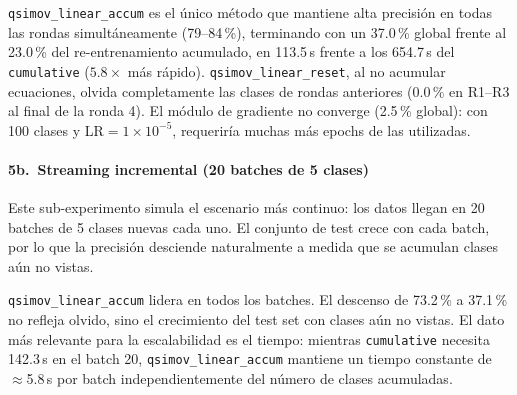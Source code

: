 \texttt{qsimov\_linear\_accum} es el único método que mantiene alta precisión en todas las rondas
simultáneamente (79--84\,\%), terminando con un 37.0\,\% global frente al 23.0\,\% del
re-entrenamiento acumulado, en 113.5\,s frente a los 654.7\,s del \texttt{cumulative}
($5.8\times$ más rápido). \texttt{qsimov\_linear\_reset}, al no acumular ecuaciones, olvida
completamente las clases de rondas anteriores (0.0\,\% en R1--R3 al final de la ronda 4). El módulo
de gradiente no converge (2.5\,\% global): con 100 clases y LR$=1\times10^{-5}$, requeriría muchas
más epochs de las utilizadas.

\paragraph{5b.~Streaming incremental (20 batches de 5 clases)}

Este sub-experimento simula el escenario más continuo: los datos llegan en 20 batches de 5 clases
nuevas cada uno. El conjunto de test crece con cada batch, por lo que la precisión desciende
naturalmente a medida que se acumulan clases aún no vistas.

\begin{table}[htbp]
  \centering
  \caption{Precisión sobre el test acumulado en batches seleccionados (ImageNet-100, streaming).}
  \label{tab:tabla7}
\end{table}

\texttt{qsimov\_linear\_accum} lidera en todos los batches. El descenso de 73.2\,\% a 37.1\,\% no
refleja olvido, sino el crecimiento del test set con clases aún no vistas. El dato más relevante
para la escalabilidad es el tiempo: mientras \texttt{cumulative} necesita 142.3\,s en el batch 20,
\texttt{qsimov\_linear\_accum} mantiene un tiempo constante de $\approx$5.8\,s por batch
independientemente del número de clases acumuladas.

